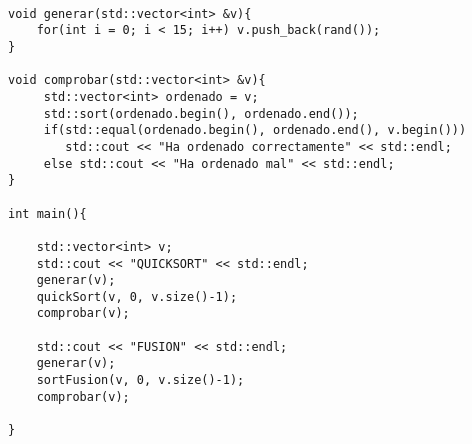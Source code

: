 \begin{lstlisting}
    
void generar(std::vector<int> &v){
    for(int i = 0; i < 15; i++) v.push_back(rand());
}

void comprobar(std::vector<int> &v){
     std::vector<int> ordenado = v;
     std::sort(ordenado.begin(), ordenado.end());
     if(std::equal(ordenado.begin(), ordenado.end(), v.begin())) 
        std::cout << "Ha ordenado correctamente" << std::endl;
     else std::cout << "Ha ordenado mal" << std::endl;
}

int main(){

    std::vector<int> v;
    std::cout << "QUICKSORT" << std::endl;
    generar(v);
    quickSort(v, 0, v.size()-1);
    comprobar(v);
    
    std::cout << "FUSION" << std::endl;
    generar(v);
    sortFusion(v, 0, v.size()-1);
    comprobar(v);

}

\end{lstlisting}